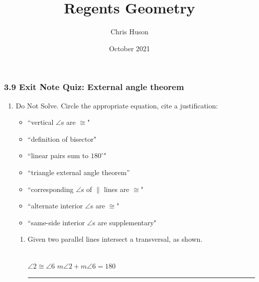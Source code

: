 \documentclass[12pt, twoside]{article}
\title{Regents Geometry}
\author{Chris Huson}
\date{October 2021}
\begin{document}
\subsubsection*{3.9 Exit Note Quiz: External angle theorem}
\begin{enumerate}
\item Do Not Solve. Circle the appropriate equation, cite a  justification:
  \begin{multicols}{2}
    \begin{itemize} 
      \item ``vertical $\angle$s are $\cong$" 
      \item ``definition of bisector" 
      \item ``linear pairs sum to $180^\circ$" 
      \item ``triangle external angle theorem''
      \item ``corresponding $\angle$s of $\parallel$ lines are $\cong$" 
      \item ``alternate interior $\angle$s are $\cong$"
      \item ``same-side interior $\angle$s are supplementary"
    \end{itemize}
  \end{multicols}
  \begin{enumerate}

    \item Given two parallel lines intersect a transversal, as shown. \hspace{1.5cm}
     \\[0.5cm]
    $\angle 2 \cong \angle 6$ \hspace{1cm} $m\angle 2 + m\angle 6 =  180$ \hspace{0.5cm} \rule{6cm}{0.15mm}
  

\end{enumerate}
\end{enumerate}
\end{document}

